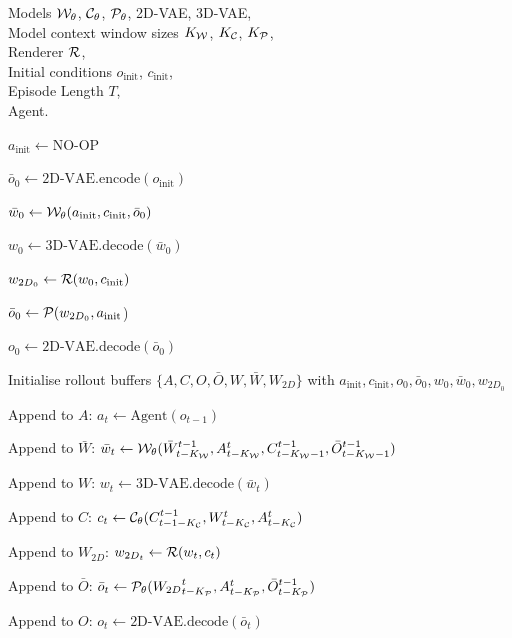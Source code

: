 \documentclass{article}
\theoremstyle{plain}
\theoremstyle{definition}
\theoremstyle{remark}
\newlength{\algleftcol}
\newcommand{\AlgLeftBox}[1]{%
  \parbox[t]{\algleftcol}{\raggedright\strut\ignorespaces#1\unskip\strut}%
}
\let\OldState\State
\renewcommand{\State}[1]{%
  \OldState \AlgLeftBox{#1}%
}
\newcommand{\Input}[1]{%
  \Require \parbox[t]{\algleftcol}{\raggedright #1}%
}
\renewcommand{\Input}[1]{%
  \Require \AlgLeftBox{#1}%
}
\begin{document}
\begin{algorithm}[htb!]
\centering
\caption{PERSIST inference logic.}\label{alg:PERSIST}
\begin{algorithmic}[1]
\Input{Models ${\mathcal{W}}_\theta$, ${\mathcal{C}}_\theta$, ${\mathcal{P}}_\theta$, 2D-VAE, 3D-VAE, \\ Model context window sizes $K_{{\mathcal{W}}}$, $K_{{\mathcal{C}}}$, $K_{{\mathcal{P}}}$, \\ 
Renderer ${\mathcal{R}}$, \\
Initial conditions $o_\text{init}$, $c_\text{init}$, \\
Episode Length $T$, \\
Agent.}
\State{$a_\text{init}\leftarrow \text{NO-OP}$} 
\State{$\bar{o}_0 \leftarrow \text{2D-VAE.encode}(o_\text{init})$}
\State{$\bar{w}_0 \leftarrow {\mathcal{W}}_\theta (a_\text{init}, c_\text{init}, \bar{o}_0)$}
\State{$w_0 \leftarrow \text{3D-VAE.decode}(\bar{w}_0)$}
\State{$w_{{2D}_0} \leftarrow {\mathcal{R}}(w_0,c_\text{init})$}
\State{$\bar{o}_0 \leftarrow {\mathcal{P}} (w_{{2D}_0}, a_\text{init}$)} 
\State{$o_0 \leftarrow \text{2D-VAE.decode}(\bar{o}_0)$}
\State{Initialise rollout buffers $\{A,C,O,\bar{O},W,\bar{W},W_{2D}\}$ with $a_\text{init},c_\text{init},o_0,\bar{o}_0,w_0,\bar{w}_0,w_{{2D}_0}$}
\State{Append to $A$: $a_t \leftarrow \text{Agent}(o_{t-1})$}
\State{Append to $\bar{W}$: $\bar{w}_t \leftarrow {\mathcal{W}}_\theta(\bar{W}^{t-1}_{t-K_{\mathcal{W}}}, A^t_{t-K_{\mathcal{W}}}, C^{t-1}_{t-K_{\mathcal{W}}-1}, \bar{O}^{t-1}_{t-K_{\mathcal{W}}-1})$}
\State{Append to $W$: $w_t \leftarrow \text{3D-VAE.decode}(\bar{w}_t)$}
\State{Append to $C$: $c_t \leftarrow {\mathcal{C}}_\theta (C^{t-1}_{t-1-K_{\mathcal{C}}}, W^t_{t-K_{\mathcal{C}}}, A^t_{t-K_{\mathcal{C}}})$}
\State{Append to $W_{2D}$: $w_{{2D}_t} \leftarrow {\mathcal{R}}(w_t,c_t)$}
\State{Append to $\bar{O}$: $\bar{o}_t \leftarrow {\mathcal{P}}_\theta ({W_{2D}}_{t-K_{\mathcal{P}}}^{t}, A^t_{t-K_{\mathcal{P}}}, \bar{O}^{t-1}_{t-K_{\mathcal{P}}})$}
\State{Append to $O$: $o_t \leftarrow \text{2D-VAE.decode}(\bar{o}_t)$}
\EndFor
\end{algorithmic}
\end{algorithm}
\end{document}
